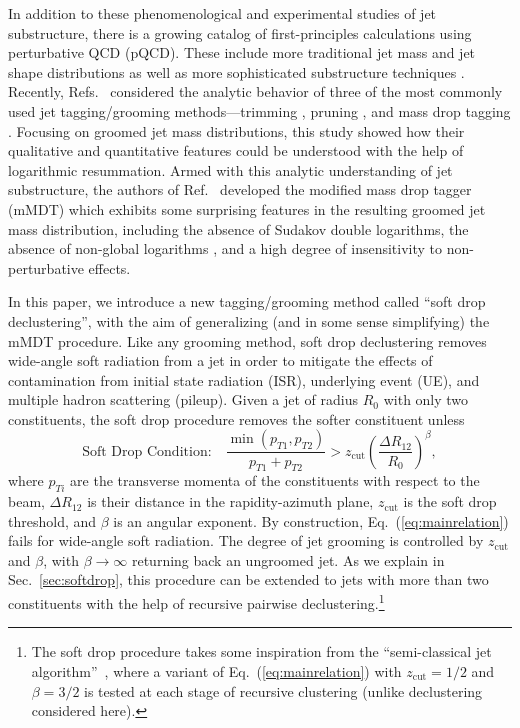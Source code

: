 \documentclass[letterpaper,11pt]{article}
\newcommand{\zcut}{z_\text{cut}}
\DeclareRobustCommand{\Sec}[1]{Sec.~\ref{#1}}
\DeclareRobustCommand{\Eq}[1]{Eq.~(\ref{#1})}
\DeclareRobustCommand{\Ref}[1]{Ref.~\cite{#1}}
\DeclareRobustCommand{\Refs}[1]{Refs.~\cite{#1}}
\begin{document}
In addition to these phenomenological and experimental studies of jet substructure, there is a growing catalog of first-principles calculations using perturbative QCD (pQCD).  These include more traditional jet mass and jet shape distributions \cite{Li:2012bw,Ellis:2010rwa,BDKM,DKMS,Chien:2012ur,Jouttenus:2013hs} as well as more sophisticated substructure techniques \cite{Rubin:2010fc,Walsh:2011fz,Feige:2012vc,Field:2012rw,Larkoski:2012eh,Larkoski:2013eya,Gerwick:2012fw,taggersRES, taggersNLO,Larkoski:2014uqa,Larkoski:2014tva}.   Recently, \Refs{taggersRES, taggersNLO} considered the analytic behavior of three of the most commonly used jet tagging/grooming methods---trimming \cite{trimming}, pruning \cite{Ellis:2009su,Ellis:2009me}, and mass drop tagging \cite{BDRS}.  Focusing on groomed jet mass distributions, this study showed how their qualitative and quantitative features could be understood with the help of logarithmic resummation.  Armed with this analytic understanding of jet substructure, the authors of \Ref{taggersRES} developed the modified mass drop tagger (mMDT) which exhibits some surprising features in the resulting groomed jet mass distribution, including the absence of Sudakov double logarithms, the absence of non-global logarithms \cite{non-global}, and a high degree of insensitivity to non-perturbative effects.

In this paper, we introduce a new tagging/grooming method called ``soft drop declustering'', with the aim of generalizing (and in some sense simplifying) the mMDT procedure.  Like any grooming method, soft drop declustering removes wide-angle soft radiation from a jet in order to mitigate the effects of contamination from initial state radiation (ISR), underlying event (UE), and multiple hadron scattering (pileup).  Given a jet of radius $R_0$ with only two constituents, the soft drop procedure removes the softer constituent unless
\begin{equation}
\label{eq:mainrelation}
\text{Soft Drop Condition:} \quad \frac{\min(p_{T1},p_{T2})}{p_{T1}+p_{T2}} > \zcut \left(\frac{\Delta R_{12}}{R_0} \right)^\beta,
\end{equation}
where $p_{Ti}$ are the transverse momenta of the constituents with respect to the beam, $\Delta R_{12}$ is their distance in the rapidity-azimuth plane, $\zcut$ is the soft drop threshold, and $\beta$ is an angular exponent.  By construction, \Eq{eq:mainrelation} fails for wide-angle soft radiation.  The degree of jet grooming is controlled by $\zcut$ and $\beta$, with $\beta \to \infty$ returning back an ungroomed jet.  As we explain in \Sec{sec:softdrop}, this procedure can be extended to jets with more than two constituents with the help of recursive pairwise declustering.\footnote{\label{footnote:semiclassical}The soft drop procedure takes some inspiration from the ``semi-classical jet algorithm''~\cite{semi-classical}, where a variant of \Eq{eq:mainrelation} with $\zcut = 1/2$ and $\beta = 3/2$ is tested at each stage of recursive clustering (unlike declustering considered here).}
\end{document}
